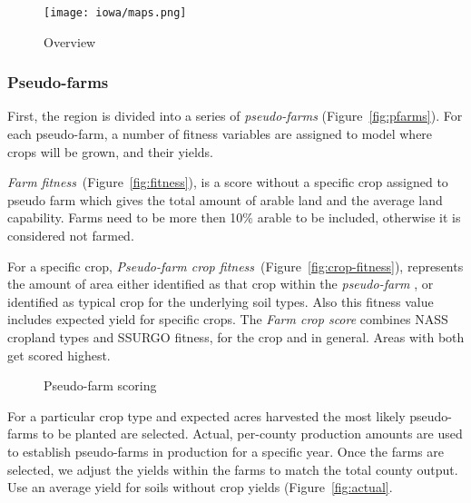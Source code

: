 \documentclass[review,3p,authoryear,times]{elsarticle}
\begin{document}
\begin{figure}[hpt]
  \centering
  \texttt{[image: iowa/maps.png]}  
  \caption{Overview}
  \label{fig:overview}
\end{figure}

\subsubsection{Pseudo-farms}

First, the region is divided into a series of \emph{pseudo-farms} (Figure~\ref{fig:pfarms}). For each pseudo-farm, a number of fitness variables are assigned to model where crops will be grown, and their yields.

\emph{Farm fitness}~(Figure~\ref{fig:fitness}), is a score without a specific crop assigned to pseudo farm which gives the total amount of arable land and the average land capability.  Farms need to be more then 10\% arable to be included, otherwise it is considered not farmed.

For a specific crop, \emph{Pseudo-farm crop fitness}~(Figure~\ref{fig:crop-fitness}), represents the amount of area either identified as that crop within the \emph{pseudo-farm} , or identified as typical crop for the underlying soil types.  Also this fitness value includes expected yield for specific crops.
The \emph{Farm crop score} combines NASS cropland types and SSURGO
fitness, for the crop and in general.  Areas with both get scored
highest.


\begin{figure}[hpt]
  \centering

  \label{fig:scores}
  \caption{Pseudo-farm scoring}
\end{figure}


For a particular crop type and expected acres harvested the most
likely pseudo-farms to be planted are selected. Actual, per-county
production amounts are used to establish pseudo-farms in production for a
specific year.  Once the farms are selected, we adjust the yields
within the farms to match the total county output. Use an average
yield for soils without crop yields (Figure~\ref{fig:actual}.
\end{document}
